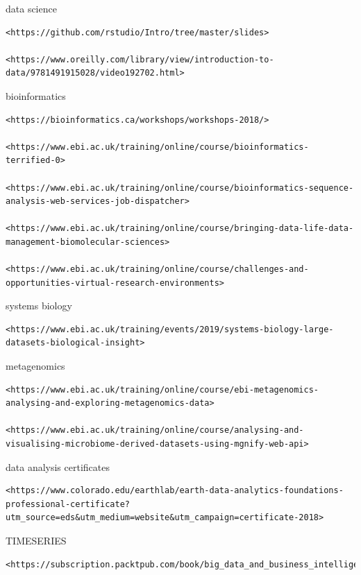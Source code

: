 \documentclass[
]{book}
\begin{document}
data science

\begin{verbatim}
<https://github.com/rstudio/Intro/tree/master/slides>

<https://www.oreilly.com/library/view/introduction-to-data/9781491915028/video192702.html>
\end{verbatim}

bioinformatics

\begin{verbatim}
<https://bioinformatics.ca/workshops/workshops-2018/>

<https://www.ebi.ac.uk/training/online/course/bioinformatics-terrified-0>

<https://www.ebi.ac.uk/training/online/course/bioinformatics-sequence-analysis-web-services-job-dispatcher>

<https://www.ebi.ac.uk/training/online/course/bringing-data-life-data-management-biomolecular-sciences>

<https://www.ebi.ac.uk/training/online/course/challenges-and-opportunities-virtual-research-environments>
\end{verbatim}

systems biology

\begin{verbatim}
<https://www.ebi.ac.uk/training/events/2019/systems-biology-large-datasets-biological-insight>
\end{verbatim}

metagenomics

\begin{verbatim}
<https://www.ebi.ac.uk/training/online/course/ebi-metagenomics-analysing-and-exploring-metagenomics-data>

<https://www.ebi.ac.uk/training/online/course/analysing-and-visualising-microbiome-derived-datasets-using-mgnify-web-api>
\end{verbatim}

data analysis certificates

\begin{verbatim}
<https://www.colorado.edu/earthlab/earth-data-analytics-foundations-professional-certificate?utm_source=eds&utm_medium=website&utm_campaign=certificate-2018>
\end{verbatim}

TIMESERIES

\begin{verbatim}
<https://subscription.packtpub.com/book/big_data_and_business_intelligence/9781786462411>
\end{verbatim}
\end{document}

